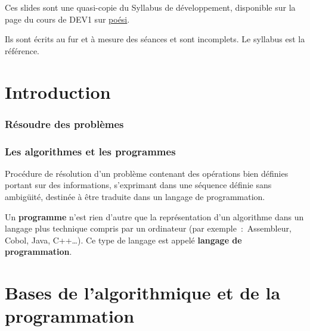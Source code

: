 \begin{frame}[plain]
  \titlepage
\end{frame}


\begin{hideedit}
\begin{frame}
  Ces slides sont une quasi-copie du Syllabus de développement, disponible sur
  la page du cours de DEV1 sur \href{https://poesi.esi-bru.be}{poési}.

  Ils sont écrits au fur et à mesure des séances et sont incomplets. Le
  syllabus est la référence.

\end{frame}

\part{Introduction}
\frame{\partpage}
\section{Résoudre des problèmes}
\frame{\sectionpage}
\section{Les algorithmes et les programmes}
\frame{\sectionpage}
\begin{frame}
  \begin{definition}[Algorithme]
    Procédure de résolution d’un problème
    contenant des opérations bien définies
    portant sur des informations,
    s’exprimant dans une séquence définie sans ambigüité,
    destinée à être traduite dans un langage de programmation.
  \end{definition}
  \begin{definition}[Programme]
    Un \textbf{programme} n’est rien d’autre
    que la représentation d’un algorithme
    dans un langage plus technique compris par un ordinateur
    (par exemple~:~Assembleur, Cobol, Java, C++\dots).
    Ce type de langage est appelé
    \textbf{langage de programmation}.
  \end{definition}
\end{frame}

\part{Bases de l'algorithmique et de la programmation}
\frame{\partpage}


\end{hideedit}
